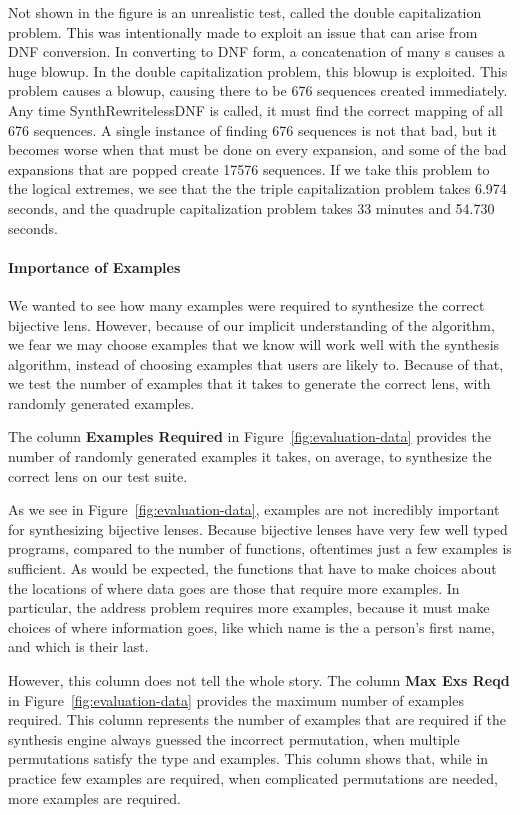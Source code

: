 \documentclass[numbers,10pt,preprint\ifanon ,nocopyrightspace\fi]{sigplanconf}
\begin{document}
Not shown in the figure is an unrealistic test, called the
double capitalization problem.  This was intentionally made to
exploit an issue that can arise from DNF conversion.  In converting to DNF form,
a concatenation of many \OrRegexType{}s causes a huge blowup.  In the
double capitalization problem, this blowup is exploited.  This problem causes a
blowup, causing there to be 676 sequences created immediately.
Any time SynthRewritelessDNF is called, it must find the correct mapping of all
676 sequences.  A single instance of finding 676 sequences is not that bad, but it
becomes worse when that must be done on every expansion, and some of the bad
expansions that are popped create 17576 sequences.
If we take this problem to the logical extremes, we see that the the triple
capitalization problem takes 6.974 seconds, and the quadruple capitalization
problem takes 33 minutes and 54.730 seconds.

\paragraph*{Importance of Examples}

We wanted to see how many examples were required to synthesize the correct
bijective lens.
However, because of our implicit understanding of the algorithm, we fear we may
choose examples that we know will work well with the synthesis algorithm,
instead of choosing examples that users are likely to.
Because of that, we test the number of examples that it takes to generate the
correct lens, with randomly generated examples.

The column \textbf{Examples Required} in Figure~\ref{fig:evaluation-data}
provides the number of randomly generated examples it takes, on average, to
synthesize the correct lens on our test suite.  

As we see in Figure~\ref{fig:evaluation-data}, examples are not
incredibly
important for synthesizing bijective lenses.
Because bijective lenses have very few well typed programs, compared to the
number of functions, oftentimes just a few examples is sufficient.
As would be expected, the functions that have to make choices about the
locations of where data goes are those that require more examples.
In particular, the address problem requires more examples, because it must make
choices of where information goes, like which name is the a person's first name,
and which is their last.

However, this column does not tell the whole story.
The column \textbf{Max Exs Reqd} in Figure~\ref{fig:evaluation-data}
provides the maximum number of examples required.
This column represents the number of examples that are required if the
synthesis engine always guessed the incorrect permutation, when multiple
permutations satisfy the type and examples.
This column shows that, while in practice few examples are required,
when complicated permutations are needed, more examples are required.
\end{document}
